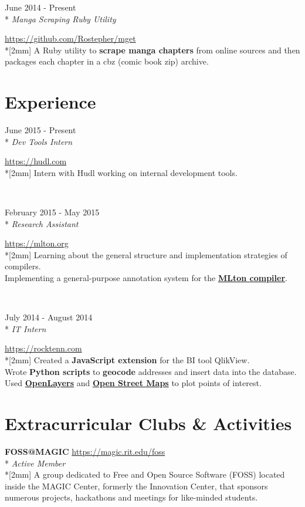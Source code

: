 \documentclass[a4paper,margin,line]{resume}
\newcommand{\rvspace}{2mm} %
\newcommand{\rurl}[1]{\hfill {\footnotesize \url{#1}}}
\newcommand{\rdate}[1]{\hfill {\small #1}}
\newcommand{\rdescription}[1]{\small #1 \normalsize}
\newcommand{\ritem}[5] {
    \item[#1]                               %
    \hfill \rdate{#2} \\*                   %
    \hfill {\small \emph{#3}}               %
    \strut \hfill \rurl{#4} \\*[\rvspace]   %
    \rdescription{#5}                       %
}
\newcommand{\remployer}{\ritem}
\newcommand{\rproject}{\ritem}
\newcommand{\rorganization}[4] {
    \item{\bf #1}                           %
    \rurl{#2} \\*                           %
    \hfill {\small \emph{#3}} \\*[\rvspace] %
    \rdescription{#4}                       %
}
\begin{document}
\begin{resume}
\begin{asparadesc}
        \rproject {mget}
                  {June 2014 - Present}
                  {Manga Scraping Ruby Utility}
                  {https://github.com/Rostepher/mget}
        {
            A Ruby utility to {\bf scrape manga chapters} from online sources
            and then packages each chapter in a cbz (comic book zip) archive.
        }
    \end{asparadesc}

\section{\mysidestyle Experience}
	\begin{asparadesc}
        \remployer {Hudl}
                   {June 2015 - Present}
                   {Dev Tools Intern}
                   {https://hudl.com}
        {
            Intern with Hudl working on internal development tools.
        }
        \\

        \remployer {Rochester Institute of Technology}
                   {February 2015 - May 2015}
                   {Research Assistant}
                   {https://mlton.org}
        {
            Learning about the general structure and implementation strategies
            of compilers.\\
            Implementing a general-purpose annotation system for the
            \href{https://mlton.org}{\bf MLton compiler}.
        }
        \\

        \remployer {RockTenn}
                   {July 2014 - August 2014}
                   {IT Intern}
                   {https://rocktenn.com}
        {
            Created a {\bf JavaScript extension} for the BI tool QlikView.\\
            Wrote {\bf Python scripts} to {\bf geocode} addresses and insert
            data into the database.\\
            Used \href{https://openlayers.org}{\bf OpenLayers} and
            \href{https://openstreetmap.org}{\bf Open Street Maps} to plot points
            of interest.
	    }
    \end{asparadesc}

\section{\mysidestyle Extracurricular Clubs \& Activities}
	\begin{asparablank}
        \rorganization {FOSS@MAGIC}
                       {https://magic.rit.edu/foss}
                       {Active Member}
        {
            A group dedicated to Free and Open Source Software (FOSS) located
            inside the MAGIC Center, formerly the Innovation Center, that
            sponsors numerous projects, hackathons and meetings for like-minded
            students.
        }
        \\


\end{asparablank}
\end{resume}
\end{document}
